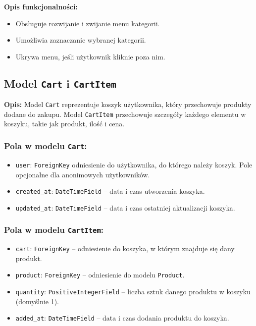 \documentclass[12pt,a4paper,oneside]{article}
\theoremstyle{definition}
\numberwithin{equation}{section}
\begin{document}
\textbf{Opis funkcjonalności:}
\begin{itemize}
    \item Obsługuje rozwijanie i zwijanie menu kategorii.
    \item Umożliwia zaznaczanie wybranej kategorii.
    \item Ukrywa menu, jeśli użytkownik kliknie poza nim.
\end{itemize}

\clearpage 
% 
% 

\subsection{Model \texttt{Cart} i \texttt{CartItem}}

\textbf{Opis:}  
Model \texttt{Cart} reprezentuje koszyk użytkownika, który przechowuje produkty dodane do zakupu. Model \texttt{CartItem} przechowuje szczegóły każdego elementu w koszyku, takie jak produkt, ilość i cena.

\subsubsection{Pola w modelu \texttt{Cart}:}
\begin{itemize}
    \item \texttt{user}: \texttt{ForeignKey} odniesienie do użytkownika, do którego należy koszyk. 
        \subsubitem *Pole opcjonalne dla anonimowych użytkowników.
    \item \texttt{created\_at}: \texttt{DateTimeField} – data i czas utworzenia koszyka.
    \item \texttt{updated\_at}: \texttt{DateTimeField} – data i czas ostatniej aktualizacji koszyka.
\end{itemize}

\subsubsection{Pola w modelu \texttt{CartItem}:}
\begin{itemize}
    \item \texttt{cart}: \texttt{ForeignKey} – odniesienie do koszyka, w którym znajduje się dany produkt.
    \item \texttt{product}: \texttt{ForeignKey} – odniesienie do modelu \texttt{Product}.
    \item \texttt{quantity}: \texttt{PositiveIntegerField} – liczba sztuk danego produktu w koszyku (domyślnie 1).
    \item \texttt{added\_at}: \texttt{DateTimeField} – data i czas dodania produktu do koszyka.
\end{itemize}
\end{document}
